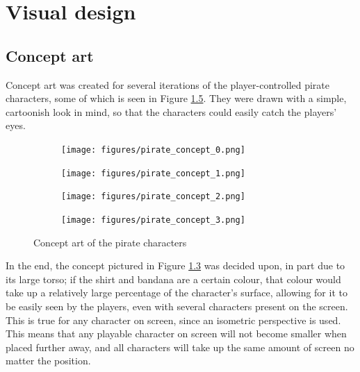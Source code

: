 \chapter{Visual design}\label{ch:visualDesign}
\section{Concept art}
Concept art was created for several iterations of the player-controlled pirate characters, some of which is seen in Figure \ref{fig:pirate_concepts}. They were drawn with a simple, cartoonish look in mind, so that the characters could easily catch the players' eyes. 

\begin{figure}[h!]
    \centering
    \begin{subfigure}[b]{0.2\textwidth}
		\centering        
        \texttt{[image: figures/pirate\_concept\_0.png]}\caption{ \label{fig:pirate_concept_0}}
    \end{subfigure}
    \begin{subfigure}[b]{0.2\textwidth}
    	\centering
        \texttt{[image: figures/pirate\_concept\_1.png]}\caption{ \label{fig:pirate_concept_1}}
    \end{subfigure}
    \begin{subfigure}[b]{0.2\textwidth}
    	\centering
        \texttt{[image: figures/pirate\_concept\_2.png]}\caption{ \label{fig:pirate_concept_2}}
    \end{subfigure}
    \begin{subfigure}[b]{0.2\textwidth}
    	\centering
        \texttt{[image: figures/pirate\_concept\_3.png]}\caption{ \label{fig:pirate_concept_3}}
    \end{subfigure}
    \caption{Concept art of the pirate characters}\label{fig:pirate_concepts}
\end{figure}

In the end, the concept pictured in Figure \ref{fig:pirate_concept_2} was decided upon, in part due to its large torso; if the shirt and bandana are a certain colour, that colour would take up a relatively large percentage of the character's surface, allowing for it to be easily seen by the players, even with several characters present on the screen. This is true for any character on screen, since an isometric perspective is used. This means that any playable character on screen will not become smaller when placed further away, and all characters will take up the same amount of screen no matter the position.

